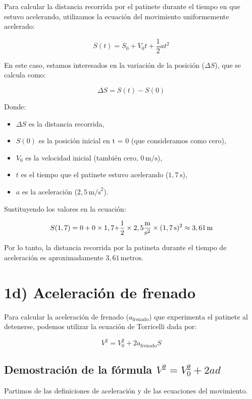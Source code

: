 \documentclass{article}
\begin{document}
Para calcular la distancia recorrida por el patinete durante el tiempo en que estuvo acelerando, utilizamos la ecuación del movimiento uniformemente acelerado:

\[
S(t) = S_0 + V_0 t + \frac{1}{2} a t^2
\]

En este caso, estamos interesados en la variación de la posición (\(\Delta S\)), que se calcula como:

\[
\Delta S = S(t) - S(0)
\]

Donde:
\begin{itemize}
    \item \(\Delta S\) es la distancia recorrida,
    \item \(S(0)\) es la posición inicial en t = 0 (que consideramos como cero),
    \item \(V_0\) es la velocidad inicial (también cero, \(0 \, \text{m/s}\)),
    \item \(t\) es el tiempo que el patinete estuvo acelerando (\(1,7 \, \text{s}\)),
    \item \(a\) es la aceleración (\(2,5 \, \text{m/s}^2\)).
\end{itemize}

Sustituyendo los valores en la ecuación:

\[
S(1,7) = 0 + 0 \times 1,7 \text + \frac{1}{2} \times 2,5 \frac{\text{m}}{\text{s}^2} \times (1,7 \, \text{s})^2 \approx 3,61 \, \text{m}
\]

Por lo tanto, la distancia recorrida por la patineta durante el tiempo de aceleración es aproximadamente \(3,61 \, \text{metros}\).



\section*{1d) Aceleración de frenado}

Para calcular la aceleración de frenado (\(a_{\text{frenado}}\)) que experimenta el patinete al detenerse, podemos utilizar la ecuación de Torricelli dada por:

\[
V^2 = V_0^2 + 2 a_{\text{frenado}} S
\]

\subsection*{Demostración de la fórmula \( V^2 = V_0^2 + 2ad \)}

Partimos de las definiciones de aceleración y de las ecuaciones del movimiento.
\end{document}
